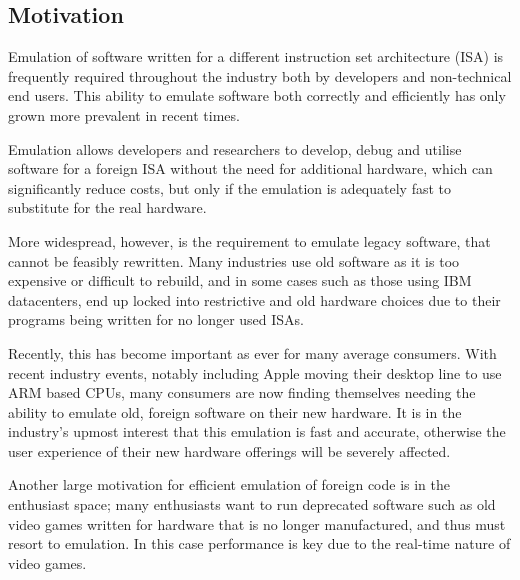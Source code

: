 \subsection{Motivation}

Emulation of software written for a different instruction set architecture (ISA) is frequently required throughout the industry both by developers and non-technical end users. This ability to emulate software both correctly and efficiently has only grown more prevalent in recent times.

Emulation allows developers and researchers to develop, debug and utilise software for a foreign ISA without the need for additional hardware, which can significantly reduce costs, but only if the emulation is adequately fast to substitute for the real hardware.

More widespread, however, is the requirement to emulate legacy software, that cannot be feasibly rewritten. Many industries use old software as it is too expensive or difficult to rebuild, and in some cases such as those using IBM datacenters, end up locked into restrictive and old hardware choices due to their programs being written for no longer used ISAs.

Recently, this has become important as ever for many average consumers. With recent industry events, notably including Apple moving their desktop line to use ARM based CPUs, many consumers are now finding themselves needing the ability to emulate old, foreign software on their new hardware. It is in the industry's upmost interest that this emulation is fast and accurate, otherwise the user experience of their new hardware offerings will be severely affected.

Another large motivation for efficient emulation of foreign code is in the enthusiast space; many enthusiasts want to run deprecated software such as old video games written for hardware that is no longer manufactured, and thus must resort to emulation. In this case performance is key due to the real-time nature of video games.
